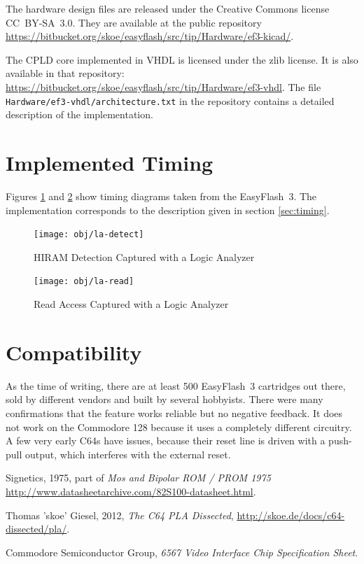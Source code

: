 \documentclass[a4paper,oneside]{memoir}
\begin{document}
The hardware design files are released under the Creative Commons license CC~BY-SA~3.0.
They are available at the public repository
\url{https://bitbucket.org/skoe/easyflash/src/tip/Hardware/ef3-kicad/}.

The CPLD core implemented in VHDL is licensed under the zlib license.
It is also available in that repository:
\url{https://bitbucket.org/skoe/easyflash/src/tip/Hardware/ef3-vhdl}.
The file \texttt{Hardware/ef3-vhdl/architecture.txt} in the repository contains a
detailed description of the implementation.

\section{Implemented Timing}

Figures \ref{fig:la-detect} and \ref{fig:la-read} show timing diagrams taken from the EasyFlash~3.
The implementation corresponds to the description given in section \ref{sec:timing}.

\begin{figure}
    \centering
    \texttt{[image: obj/la-detect]}
    \caption{HIRAM Detection Captured with a Logic Analyzer}
    \label{fig:la-detect}
\end{figure}

\begin{figure}
    \centering
    \texttt{[image: obj/la-read]}
    \caption{Read Access Captured with a Logic Analyzer}
    \label{fig:la-read}
\end{figure}

\section{Compatibility}

As the time of writing, there are at least 500 EasyFlash~3 cartridges out there, sold by different vendors and built by several hobbyists.
There were many confirmations that the feature works reliable but no negative feedback.
It does not work on the Commodore 128 because it uses a completely different circuitry.
A few very early C64s have issues, because their reset line is driven with a push-pull output, which interferes with the external reset.

\begin{thebibliography}{999}

 Signetics, 1975, part of \textit{Mos and Bipolar ROM / PROM 1975}
\url{http://www.datasheetarchive.com/82S100-datasheet.html}.

 Thomas 'skoe' Giesel, 2012, \textit{The C64 PLA Dissected},
\url{http://skoe.de/docs/c64-dissected/pla/}.

 Commodore Semiconductor Group, \textit{6567 Video Interface Chip Specification Sheet}.

\end{thebibliography}
\end{document}
